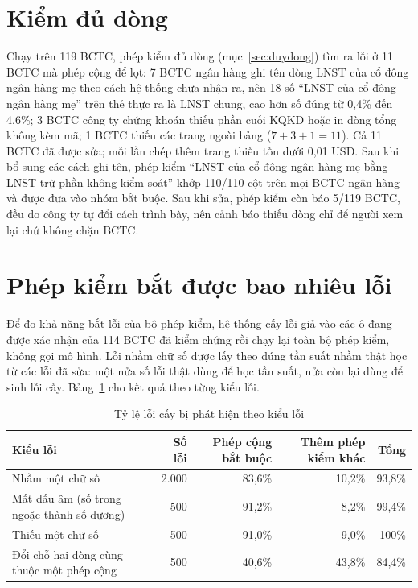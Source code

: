 \documentclass[12pt,a4paper]{report}
\newcommand{\enquote}[1]{“#1”}
\begin{document}
\section{Kiểm đủ dòng}\label{sec:evalduydong}
Chạy trên 119 BCTC, phép kiểm đủ dòng (mục~\ref{sec:duydong}) tìm ra lỗi ở 11 BCTC mà phép cộng để lọt: 7 BCTC ngân
hàng ghi tên dòng LNST của cổ đông ngân hàng mẹ theo cách hệ thống chưa nhận ra, nên 18 số \enquote{LNST của cổ đông
ngân hàng mẹ} trên thẻ thực ra là LNST chung, cao hơn số đúng từ 0,4\% đến 4,6\%; 3 BCTC công ty chứng khoán thiếu phần
cuối KQKD hoặc in dòng tổng không kèm mã; 1 BCTC thiếu các trang ngoài bảng ($7 + 3 + 1 = 11$). Cả 11 BCTC đã được sửa;
mỗi lần chép thêm trang thiếu tốn dưới 0,01 USD. Sau khi bổ sung các cách ghi tên, phép kiểm \enquote{LNST của cổ đông ngân hàng
mẹ bằng LNST trừ phần không kiểm soát} khớp 110/110 cột trên mọi BCTC ngân hàng và được đưa vào nhóm bắt buộc. Sau khi
sửa, phép kiểm còn báo 5/119 BCTC, đều do công ty tự đổi cách trình bày, nên cảnh báo thiếu dòng chỉ để người xem lại
chứ không chặn BCTC.

\section{Phép kiểm bắt được bao nhiêu lỗi}\label{sec:caloi}
Để đo khả năng bắt lỗi của bộ phép kiểm, hệ thống cấy lỗi giả vào các ô đang được xác nhận của 114 BCTC đã kiểm chứng
rồi chạy lại toàn bộ phép kiểm, không gọi mô hình. Lỗi nhầm chữ số được lấy theo đúng tần suất nhầm thật học từ các
lỗi đã sửa: một nửa số lỗi thật dùng để học tần suất, nửa còn lại dùng để sinh lỗi cấy. Bảng~\ref{tab:caloi} cho kết quả theo từng kiểu lỗi.

\begin{table}[H]
\centering\small
\caption{Tỷ lệ lỗi cấy bị phát hiện theo kiểu lỗi}\label{tab:caloi}
\begin{tabularx}{\linewidth}{@{}Xrrrr@{}}
\toprule
\textbf{Kiểu lỗi} & \textbf{Số lỗi} & \textbf{Phép cộng bắt buộc} & \textbf{Thêm phép kiểm khác} & \textbf{Tổng} \\ \midrule
Nhầm một chữ số & 2.000 & 83,6\% & 10,2\% & 93,8\% \\
Mất dấu âm (số trong ngoặc thành số dương) & 500 & 91,2\% & 8,2\% & 99,4\% \\
Thiếu một chữ số & 500 & 91,0\% & 9,0\% & 100\% \\
Đổi chỗ hai dòng cùng thuộc một phép cộng & 500 & 40,6\% & 43,8\% & 84,4\% \\
\bottomrule
\end{tabularx}
\end{table}
\end{document}
